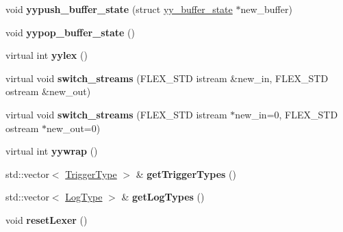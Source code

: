 \begin{DoxyCompactItemize}
\item 
void {\bfseries yypush\+\_\+buffer\+\_\+state} (struct \hyperlink{structyy__buffer__state}{yy\+\_\+buffer\+\_\+state} $\ast$new\+\_\+buffer)\hypertarget{classyyFlexLexer_ad1c28db628d822013851d46fddbab4b2}{}\label{classyyFlexLexer_ad1c28db628d822013851d46fddbab4b2}

\item 
void {\bfseries yypop\+\_\+buffer\+\_\+state} ()\hypertarget{classyyFlexLexer_a40740ddffd5cbf7b8f09ab0a7ee4fb3f}{}\label{classyyFlexLexer_a40740ddffd5cbf7b8f09ab0a7ee4fb3f}

\item 
virtual int {\bfseries yylex} ()\hypertarget{classyyFlexLexer_a17db927e4266920dc3f00a06733fb868}{}\label{classyyFlexLexer_a17db927e4266920dc3f00a06733fb868}

\item 
virtual void {\bfseries switch\+\_\+streams} (F\+L\+E\+X\+\_\+\+S\+TD istream \&new\+\_\+in, F\+L\+E\+X\+\_\+\+S\+TD ostream \&new\+\_\+out)\hypertarget{classyyFlexLexer_ae65442a383cdd294f4305898fa8dc966}{}\label{classyyFlexLexer_ae65442a383cdd294f4305898fa8dc966}

\item 
virtual void {\bfseries switch\+\_\+streams} (F\+L\+E\+X\+\_\+\+S\+TD istream $\ast$new\+\_\+in=0, F\+L\+E\+X\+\_\+\+S\+TD ostream $\ast$new\+\_\+out=0)\hypertarget{classyyFlexLexer_abc68b0433270fe0a644cf2e6b271e192}{}\label{classyyFlexLexer_abc68b0433270fe0a644cf2e6b271e192}

\item 
virtual int {\bfseries yywrap} ()\hypertarget{classyyFlexLexer_a9e46b16e6374b1b7ae696e2ba5fdc07c}{}\label{classyyFlexLexer_a9e46b16e6374b1b7ae696e2ba5fdc07c}

\item 
std\+::vector$<$ \hyperlink{structTriggerType}{Trigger\+Type} $>$ \& {\bfseries get\+Trigger\+Types} ()\hypertarget{classyyFlexLexer_a1d4195c804daa87a39dc6946ed113b18}{}\label{classyyFlexLexer_a1d4195c804daa87a39dc6946ed113b18}

\item 
std\+::vector$<$ \hyperlink{structLogType}{Log\+Type} $>$ \& {\bfseries get\+Log\+Types} ()\hypertarget{classyyFlexLexer_a9b7cad8bc401de60e249a8856018f735}{}\label{classyyFlexLexer_a9b7cad8bc401de60e249a8856018f735}

\item 
void {\bfseries reset\+Lexer} ()\hypertarget{classyyFlexLexer_aac629d1bc4697f7c3efb69e2711e5e3d}{}\label{classyyFlexLexer_aac629d1bc4697f7c3efb69e2711e5e3d}

\end{DoxyCompactItemize}
